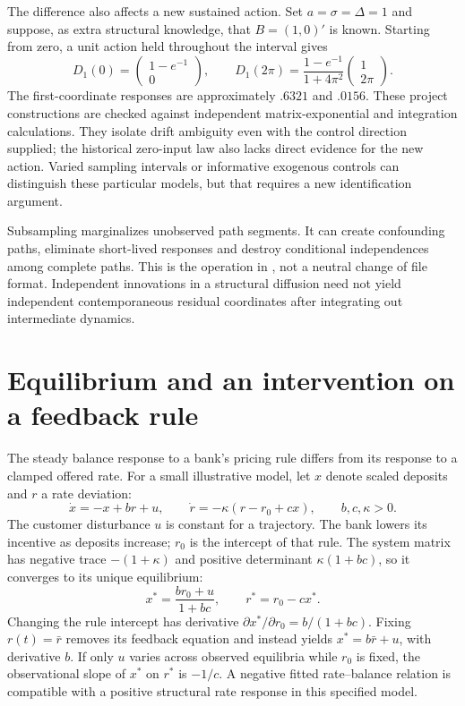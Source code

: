 The difference also affects a new sustained action. Set
$a=\sigma=\Delta=1$ and suppose, as extra structural knowledge, that
$B=(1,0)'$ is known. Starting from zero, a unit action held throughout the
interval gives
\[
 D_1(0)=\begin{pmatrix}1-e^{-1}\\0\end{pmatrix},\qquad
 D_1(2\pi)=\frac{1-e^{-1}}{1+4\pi^2}
             \begin{pmatrix}1\\2\pi\end{pmatrix}.
\]
The first-coordinate responses are approximately $.6321$ and $.0156$.
These project constructions are checked against independent
matrix-exponential and integration calculations. They isolate drift
ambiguity even with the control direction supplied; the historical
zero-input law also lacks direct evidence for the new action.
Varied sampling intervals or informative exogenous controls can distinguish
these particular models, but that requires a new identification argument.

Subsampling marginalizes unobserved path segments. It can create
confounding paths, eliminate short-lived responses and destroy conditional
independences among complete paths. This is the operation in
\citet[Definition 9 and Example 10]{sde2026}, not a neutral change of file
format. Independent innovations in a structural diffusion need not yield
independent contemporaneous residual coordinates after integrating out
intermediate dynamics.

\section{Equilibrium and an intervention on a feedback rule}
\label{r3:equilibrium}
The steady balance response to a bank's pricing rule differs from its
response to a clamped offered rate. For a small illustrative model, let
$x$ denote scaled deposits and $r$ a rate deviation:
\[
 \dot x=-x+br+u,\qquad
 \dot r=-\kappa(r-r_0+cx),\qquad b,c,\kappa>0.
\]
The customer disturbance $u$ is constant for a trajectory. The bank lowers
its incentive as deposits increase; $r_0$ is the intercept of that rule.
The system matrix has negative trace $-(1+\kappa)$ and positive determinant
$\kappa(1+bc)$, so it converges to its unique equilibrium:
\[
 x^*=\frac{br_0+u}{1+bc},\qquad r^*=r_0-cx^*.
\]
Changing the rule intercept has derivative
$\partial x^*/\partial r_0=b/(1+bc)$.
Fixing $r(t)=\bar r$ removes its feedback equation and instead yields
$x^*=b\bar r+u$, with derivative $b$.
If only $u$ varies across observed equilibria while $r_0$ is fixed,
the observational slope of $x^*$ on $r^*$ is $-1/c$.
A negative fitted rate--balance relation is compatible with a positive
structural rate response in this specified model.

